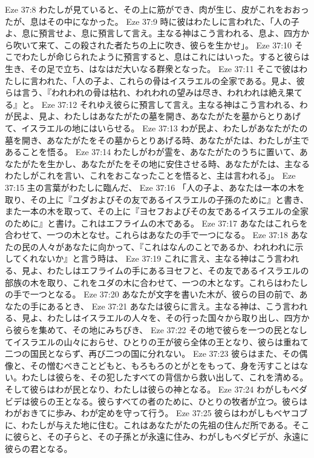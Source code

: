 Eze 37:8  わたしが見ていると、その上に筋ができ、肉が生じ、皮がこれをおおったが、息はその中になかった。
Eze 37:9  時に彼はわたしに言われた、「人の子よ、息に預言せよ、息に預言して言え。主なる神はこう言われる、息よ、四方から吹いて来て、この殺された者たちの上に吹き、彼らを生かせ」。
Eze 37:10  そこでわたしが命じられたように預言すると、息はこれにはいった。すると彼らは生き、その足で立ち、はなはだ大いなる群衆となった。
Eze 37:11  そこで彼はわたしに言われた、「人の子よ、これらの骨はイスラエルの全家である。見よ、彼らは言う、『われわれの骨は枯れ、われわれの望みは尽き、われわれは絶え果てる』と。
Eze 37:12  それゆえ彼らに預言して言え。主なる神はこう言われる、わが民よ、見よ、わたしはあなたがたの墓を開き、あなたがたを墓からとりあげて、イスラエルの地にはいらせる。
Eze 37:13  わが民よ、わたしがあなたがたの墓を開き、あなたがたをその墓からとりあげる時、あなたがたは、わたしが主であることを悟る。
Eze 37:14  わたしがわが霊を、あなたがたのうちに置いて、あなたがたを生かし、あなたがたをその地に安住させる時、あなたがたは、主なるわたしがこれを言い、これをおこなったことを悟ると、主は言われる」。
Eze 37:15  主の言葉がわたしに臨んだ、
Eze 37:16  「人の子よ、あなたは一本の木を取り、その上に『ユダおよびその友であるイスラエルの子孫のために』と書き、また一本の木を取って、その上に『ヨセフおよびその友であるイスラエルの全家のために』と書け。これはエフライムの木である。
Eze 37:17  あなたはこれらを合わせて、一つの木となせ。これらはあなたの手で一つになる。
Eze 37:18  あなたの民の人々があなたに向かって、『これはなんのことであるか、われわれに示してくれないか』と言う時は、
Eze 37:19  これに言え、主なる神はこう言われる、見よ、わたしはエフライムの手にあるヨセフと、その友であるイスラエルの部族の木を取り、これをユダの木に合わせて、一つの木となす。これらはわたしの手で一つとなる。
Eze 37:20  あなたが文字を書いた木が、彼らの目の前で、あなたの手にあるとき、
Eze 37:21  あなたは彼らに言え。主なる神は、こう言われる、見よ、わたしはイスラエルの人々を、その行った国々から取り出し、四方から彼らを集めて、その地にみちびき、
Eze 37:22  その地で彼らを一つの民となしてイスラエルの山々におらせ、ひとりの王が彼ら全体の王となり、彼らは重ねて二つの国民とならず、再び二つの国に分れない。
Eze 37:23  彼らはまた、その偶像と、その憎むべきことどもと、もろもろのとがとをもって、身を汚すことはない。わたしは彼らを、その犯したすべての背信から救い出して、これを清める。そして彼らはわが民となり、わたしは彼らの神となる。
Eze 37:24  わがしもべダビデは彼らの王となる。彼らすべての者のために、ひとりの牧者が立つ。彼らはわがおきてに歩み、わが定めを守って行う。
Eze 37:25  彼らはわがしもべヤコブに、わたしが与えた地に住む。これはあなたがたの先祖の住んだ所である。そこに彼らと、その子らと、その子孫とが永遠に住み、わがしもべダビデが、永遠に彼らの君となる。
